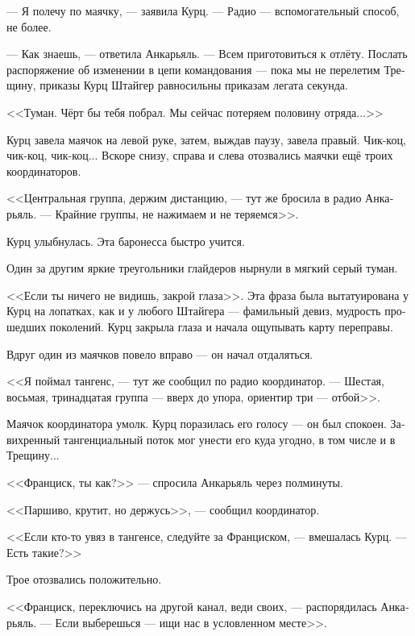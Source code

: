 \documentclass[a4paper,10pt,fleqn]{book}\usepackage{polyglossia}\setdefaultlanguage[babelshorthands=true]{russian}\setotherlanguage{english}\defaultfontfeatures{Ligatures=TeX,Mapping=tex-text}\usepackage{xcolor}\newcommand{\ml}[3]{#2}
\newcommand{\asterism}{\vspace{1em}{\centering\Large\bfseries$\ast~\ast~\ast$\par}\vspace{1em}}
\begin{document}
\asterism

--- Я полечу по маячку, --- заявила Курц.
--- Радио --- вспомогательный способ, не более.

--- Как знаешь, --- ответила Анкарьяль.
--- Всем приготовиться к отлёту.
Послать распоряжение об изменении в цепи командования --- пока мы не перелетим Трещину, приказы Курц Штайгер равносильны приказам легата секунда.

\asterism

<<Туман.
Чёрт бы тебя побрал.
Мы сейчас потеряем половину отряда...>>

Курц завела маячок на левой руке, затем, выждав паузу, завела правый.
Чик-коц, чик-коц, чик-коц...
Вскоре снизу, справа и слева отозвались маячки ещё троих координаторов.

<<Центральная группа, держим дистанцию, --- тут же бросила в радио Анкарьяль.
--- Крайние группы, не нажимаем и не теряемся>>.

Курц улыбнулась.
Эта баронесса быстро учится.

Один за другим яркие треугольники глайдеров нырнули в мягкий серый туман.

<<Если ты ничего не видишь, закрой глаза>>.
Эта фраза была вытатуирована у Курц на лопатках, как и у любого Штайгера --- фамильный девиз, мудрость прошедших поколений.
Курц закрыла глаза и начала ощупывать карту переправы.

\asterism

Вдруг один из маячков повело вправо --- он начал отдаляться.

<<Я поймал тангенс, --- тут же сообщил по радио координатор.
\ml{$0$}
{--- Шестая, восьмая, тринадцатая группа --- вверх до упора, ориентир три --- отбой>>.}
{``Group six, eight, thirteen, full up, beacon three is off.''}

Маячок координатора умолк.
Курц поразилась его голосу --- он был спокоен.
Завихренный тангенциальный поток мог унести его куда угодно, в том числе и в Трещину...

<<Франциск, ты как?>> --- спросила Анкарьяль через полминуты.

<<Паршиво, крутит, но держусь>>, --- сообщил координатор.

<<Если кто-то увяз в тангенсе, следуйте за Франциском, --- вмешалась Курц.
--- Есть такие?>>

Трое отозвались положительно.

<<Франциск, переключись на другой канал, веди своих, --- распорядилась Анкарьяль.
--- Если выберешься --- ищи нас в условленном месте>>.
\end{document}

